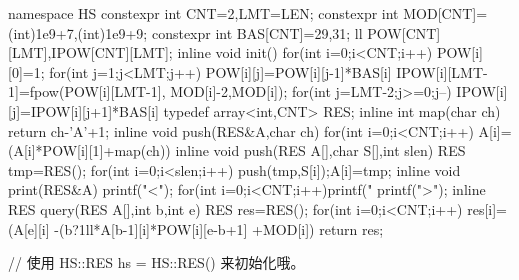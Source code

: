\begin{Cpp}
namespace HS{
  constexpr int CNT=2,LMT=LEN;
  constexpr int MOD[CNT]={
    (int)1e9+7,(int)1e9+9};
  constexpr int BAS[CNT]={29,31};
  ll POW[CNT][LMT],IPOW[CNT][LMT];
  inline void init(){
    for(int i=0;i<CNT;i++){
      POW[i][0]=1;
      for(int j=1;j<LMT;j++){
        POW[i][j]=POW[i][j-1]*BAS[i]%
      }
      IPOW[i][LMT-1]=fpow(POW[i][LMT-1],
        MOD[i]-2,MOD[i]);
      for(int j=LMT-2;j>=0;j--){
        IPOW[i][j]=IPOW[i][j+1]*BAS[i]%
      }
    }
  }
  typedef array<int,CNT> RES;
  inline int map(char ch){
    return ch-'A'+1;
  }
  inline void push(RES&A,char ch){
    for(int i=0;i<CNT;i++)
      A[i]=(A[i]*POW[i][1]+map(ch))%
  }
  inline void push(RES A[],char S[],int slen){
    RES tmp=RES();
    for(int i=0;i<slen;i++){
      push(tmp,S[i]);A[i]=tmp;
    }
  }
  inline void print(RES&A){
    printf("<");
    for(int i=0;i<CNT;i++)printf("%
    printf(">");
  }
  inline RES query(RES A[],int b,int e){
    RES res=RES();
    for(int i=0;i<CNT;i++)
      res[i]=(A[e][i]
        -(b?1ll*A[b-1][i]*POW[i][e-b+1]%
        +MOD[i])%
    return res;
  }
}

// 使用 HS::RES hs = HS::RES() 来初始化哦。
\end{Cpp}
